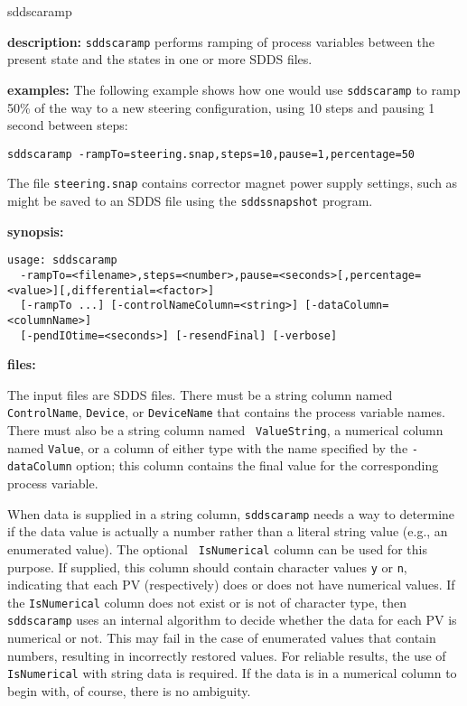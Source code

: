 \begin{sddsprog}{sddscaramp}
\item \textbf{description:}
\verb+sddscaramp+ performs ramping of process variables between
the present state and the states in one or more SDDS files.

\item \textbf{examples:}
The following example shows how one would use \verb+sddscaramp+ to
ramp 50\% of the way to a new steering configuration, using 10
steps and pausing 1 second between steps:
\begin{verbatim}
sddscaramp -rampTo=steering.snap,steps=10,pause=1,percentage=50
\end{verbatim}
The file \verb+steering.snap+ contains corrector magnet power supply
settings, such as might be saved to an SDDS file using the
\verb+sddssnapshot+ program.
\item \textbf{synopsis:}
\begin{verbatim}
usage: sddscaramp
  -rampTo=<filename>,steps=<number>,pause=<seconds>[,percentage=<value>][,differential=<factor>]
  [-rampTo ...] [-controlNameColumn=<string>] [-dataColumn=<columnName>]
  [-pendIOtime=<seconds>] [-resendFinal] [-verbose]
\end{verbatim}
\item \textbf{files:}

The input files are SDDS files.  There must be a string column named
{\tt ControlName}, {\tt Device}, or {\tt DeviceName} that contains the
process variable names.  There must also be a string column named {\tt
ValueString}, a numerical column named {\tt Value}, or a column of
either type with the name specified by the \verb+-dataColumn+ option;
this column contains the final value for the corresponding process
variable.

When data is supplied in a string column, {\tt sddscaramp} needs a way
to determine if the data value is actually a number rather than a
literal string value (e.g., an enumerated value).  The optional {\tt
IsNumerical} column can be used for this purpose.  If supplied, this
column should contain character values {\tt y} or {\tt n}, indicating
that each PV (respectively) does or does not have numerical values.
If the {\tt IsNumerical} column does not exist or is not of character
type, then {\tt sddscaramp} uses an internal algorithm to decide
whether the data for each PV is numerical or not.  This may fail in
the case of enumerated values that contain numbers, resulting in
incorrectly restored values.  For reliable results, the use of {\tt
IsNumerical} with string data is required.  If the data is in a
numerical column to begin with, of course, there is no ambiguity.


\end{sddsprog}

